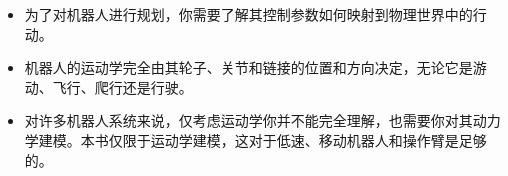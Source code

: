
\begin{itemize}
\item 为了对机器人进行规划，你需要了解其控制参数如何映射到物理世界中的行动。
\item 机器人的运动学完全由其轮子、关节和链接的位置和方向决定，无论它是游动、飞行、爬行还是行驶。
\item 对许多机器人系统来说，仅考虑运动学你并不能完全理解，也需要你对其动力学建模。本书仅限于运动学建模，这对于低速、移动机器人和操作臂是足够的。
\end{itemize}


